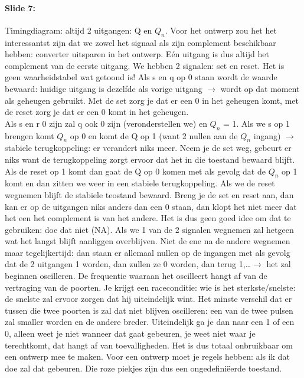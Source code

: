 \documentclass[10pt,a4paper]{book}
\begin{document}
\paragraph{Slide 7:} Timingdiagram: altijd 2 uitgangen: Q en $Q_n$. Voor het ontwerp zou het het interessantst zijn dat we zowel het signaal als zijn complement beschikbaar hebben: converter uitsparen in het ontwerp. E\'en uitgang is dus altijd het complement van de eerste uitgang. We hebben 2 signalen: set en reset. Het is geen waarheidstabel wat getoond is! Als s en q op 0 staan wordt de waarde bewaard: huidige uitgang is dezelfde als vorige uitgang $\rightarrow$ wordt op dat moment als geheugen gebruikt. Met de set zorg je dat er een 0 in het geheugen komt, met de reset zorg je dat er een 0 komt in het geheugen.\\
Als s en r 0 zijn zal q ook 0 zijn (veronderstellen we) en $Q_n$ = 1. Als we s op 1 brengen komt $Q_n$ op 0 en komt de Q op 1 (want 2 nullen aan de $Q_n$ ingang) $\rightarrow$ stabiele terugkoppeling: er verandert niks meer. Neem je de set weg, gebeurt er niks want de terugkoppeling zorgt ervoor dat het in die toestand bewaard blijft. Als de reset op 1 komt dan gaat de Q op 0 komen met als gevolg dat de $Q_n$ op 1 komt en dan zitten we weer in een stabiele terugkoppeling. Als we de reset wegnemen blijft de stabiele teostand bewaard. Breng je de set en reset aan, dan kan er op de uitgangen niks anders dan een 0 staan, dan klopt het niet meer dat het een het complement is van het andere. Het is dus geen goed idee om dat te gebruiken: doe dat niet (NA). Als we 1 van de 2 signalen wegnemen zal hetgeen wat het langst blijft aanliggen overblijven. Niet de ene na de andere wegnemen maar tegelijkertijd: dan staan er allemaal nullen op de ingangen met als gevolg dat de 2 uitgangen 1 worden, dan zullen ze 0 worden, dan terug 1,\ldots $\rightarrow$ het zal beginnen oscilleren. De frequentie waaraan het oscilleert hangt af van de vertraging van de poorten. Je krijgt een raceconditie: wie is het sterkste/snelste: de snelste zal ervoor zorgen dat hij uiteindelijk wint. Het minste verschil dat er tussen die twee poorten is zal dat niet blijven oscilleren: een van de twee pulsen zal smaller worden en de andere breder. Uiteindelijk ga je dan naar een 1 of een 0, alleen weet je niet wanneer dat gaat gebeuren, je weet niet waar je terechtkomt, dat hangt af van toevalligheden. Het is dus totaal onbruikbaar om een ontwerp mee te maken. Voor een ontwerp moet je regels hebben: als ik dat doe zal dat gebeuren. Die roze piekjes zijn dus een ongedefini\"eerde toestand.
\end{document}
